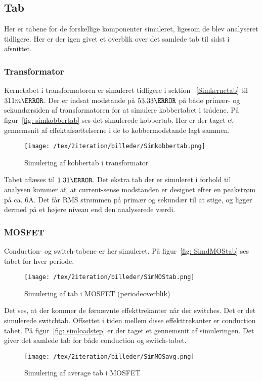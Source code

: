   

\subsection{Tab}
Her er tabene for de forskellige komponenter simuleret, ligesom de blev analyseret tidligere. Her er der igen givet et overblik over det samlede tab til sidst i afsnittet.

\subsubsection{Transformator}
Kernetabet i transformatoren er simuleret tidligere i sektion ~\ref{Simkernetab} til $311m\watt$. Der er indsat modstande på $53.33\ohm$ på både primær- og sekundærsiden af transformatoren for at simulere kobbertabet i trådene. På figur~\ref{fig: simkobbertab} ses det simulerede kobbertab. Her er der taget et gennemsnit af effektafsættelserne i de to kobbermodstande lagt sammen. 
\begin{figure}[H]
	\center
	\texttt{[image: /tex/2iteration/billeder/Simkobbertab.png]}
	\caption{Simulering af kobbertab i transformator}
	\label{fig: Simkobbertab}
\end{figure}

Tabet aflæses til $1.31\watt$. Det ekstra tab der er simuleret i forhold til analysen kommer af, at current-sense modstanden er designet efter en peakstrøm på ca. 6A. Det får RMS strømmen på primær og sekundær til at stige, og ligger dermed på et højere niveau end den analyserede værdi.

\subsubsection{MOSFET} \label{MOSFETsimtab}
\noindent Conduction- og switch-tabene er her simuleret. På figur~\ref{fig: SimdMOStab} ses tabet for hver periode.
\begin{figure}[H]
	\center
	\texttt{[image: /tex/2iteration/billeder/SimMOStab.png]}
	\caption{Simulering af tab i MOSFET (periodeoverblik)}
	\label{fig: SimMOStab}
\end{figure} 

Det ses, at der kommer de førnævnte effekttrekanter når der switches. Det er det simulerede switchtab. Offsettet i tiden mellem disse effekttrekanter er conduction tabet.
På figur~\ref{fig: simloadstep} er der taget et gennemsnit af simuleringen. Det giver det samlede tab for både conduction og switch-tabet. 
\begin{figure}[H]
	\center
	\texttt{[image: /tex/2iteration/billeder/SimMOSavg.png]}
	\caption{Simulering af average tab i MOSFET}
	\label{fig: SimMOSavg}
\end{figure} 

